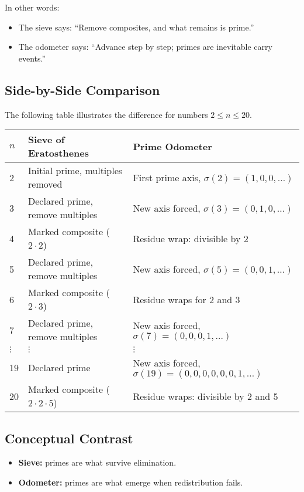 \documentclass[11pt]{article}
\theoremstyle{definition}
\begin{document}
In other words:
\begin{itemize}
  \item The sieve says: ``Remove composites, and what remains is prime.''
  \item The odometer says: ``Advance step by step; primes are inevitable 
        carry events.''
\end{itemize}

\subsection{Side-by-Side Comparison}

The following table illustrates the difference for numbers $2 \leq n \leq 20$.

\begin{center}
\begin{tabular}{@{}lll@{}}
\toprule
$n$ & \textbf{Sieve of Eratosthenes} & \textbf{Prime Odometer} \\
\midrule
2   & Initial prime, multiples removed & First prime axis, $\sigma(2)=(1,0,0,\dots)$ \\
3   & Declared prime, remove multiples & New axis forced, $\sigma(3)=(0,1,0,\dots)$ \\
4   & Marked composite ($2 \cdot 2$)   & Residue wrap: divisible by 2 \\
5   & Declared prime, remove multiples & New axis forced, $\sigma(5)=(0,0,1,\dots)$ \\
6   & Marked composite ($2 \cdot 3$)   & Residue wraps for 2 and 3 \\
7   & Declared prime, remove multiples & New axis forced, $\sigma(7)=(0,0,0,1,\dots)$ \\
$\vdots$ & $\vdots$ & $\vdots$ \\
19  & Declared prime                   & New axis forced, $\sigma(19)=(0,0,0,0,0,0,1,\dots)$ \\
20  & Marked composite ($2 \cdot 2 \cdot 5$) & Residue wraps: divisible by 2 and 5 \\
\bottomrule
\end{tabular}
\end{center}

\subsection{Conceptual Contrast}

\begin{studentnote}
\begin{itemize}
  \item \textbf{Sieve:} primes are what survive elimination.
  \item \textbf{Odometer:} primes are what emerge when redistribution fails.
\end{itemize}
\end{studentnote}
\end{document}
